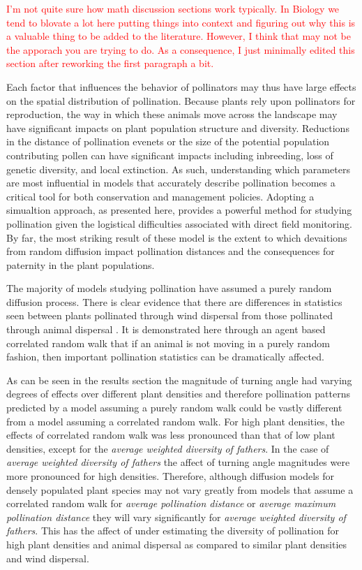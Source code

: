 \textcolor{red}{I'm not quite sure how math discussion sections work typically.
In Biology we tend to blovate a lot here putting things into context and
figuring out why this is a valuable thing to be added to the literature.
However, I think that may not be the apporach you are trying to do.  As a
consequence, I just minimally edited this section after reworking the first
paragraph a bit. }

Each factor that influences the behavior of pollinators may thus have large
effects on the spatial distribution of pollination. Because plants rely upon
pollinators for reproduction, the way in which these animals move across the
landscape may have significant impacts on plant population structure and
diversity. Reductions in the distance of pollination evenets or the size of the
potential population contributing pollen can have significant impacts including
inbreeding, loss of genetic diversity, and local extinction.  As such,
understanding which parameters are most influential in models that accurately
describe pollination becomes a critical tool for both conservation and
management policies.  Adopting a simualtion approach, as presented here,
provides a powerful method for studying pollination given the logistical
difficulties associated with direct field monitoring.  By far, the most striking
result of these model is the extent to which devaitions from random diffusion
impact pollination distances and the consequences for paternity in the plant
populations. 

The majority of models studying pollination have assumed a purely random
diffusion process. There is clear evidence that there are differences in
statistics seen between plants pollinated through wind dispersal from those
pollinated through animal dispersal \cite{LevinKerster}.  It is demonstrated
here through an agent based correlated random walk that if an animal is not
moving in a purely random fashion, then important pollination statistics can be
dramatically affected. 

As can be seen in the results section the magnitude of turning angle had varying
degrees of effects over different plant densities and therefore pollination
patterns predicted by a model assuming a purely random walk could be vastly
different from a model assuming a correlated random walk. For high plant
densities, the effects of correlated random walk was less pronounced than that
of low plant densities, except for the \emph{average weighted diversity of
fathers}. In the case of \emph{average weighted diversity of fathers} the affect
of turning angle magnitudes were more pronounced for high densities. Therefore,
although diffusion models for densely populated plant species may not vary
greatly from models that assume a correlated random walk for \emph{average
pollination distance} or \emph{average maximum pollination distance} they will
vary significantly for \emph{average weighted diversity of fathers}. This has
the affect of under estimating the diversity of pollination for high plant
densities and animal dispersal as compared to similar plant densities and wind
dispersal.

